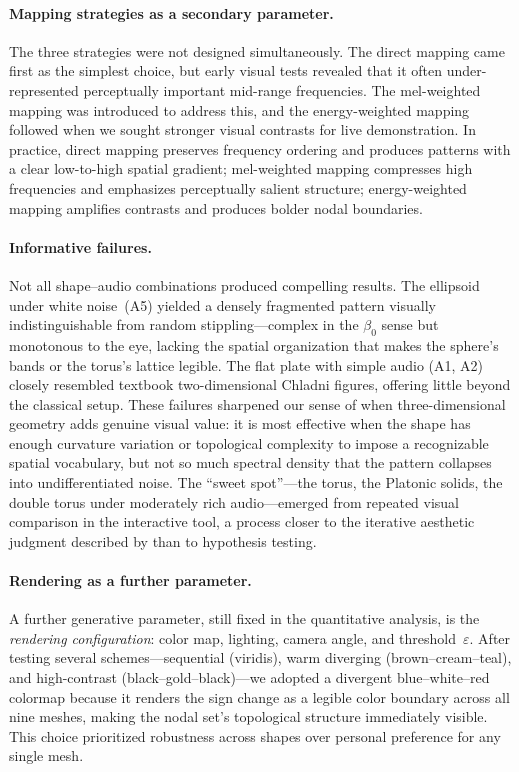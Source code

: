 \documentclass[]{interact}
\theoremstyle{plain}
\theoremstyle{definition}
\theoremstyle{remark}
\begin{document}
\paragraph{Mapping strategies as a secondary parameter.}
The three strategies were not designed simultaneously. The direct mapping came first as the simplest choice, but early visual tests revealed that it often under-represented perceptually important mid-range frequencies. The mel-weighted mapping was introduced to address this, and the energy-weighted mapping followed when we sought stronger visual contrasts for live demonstration. In practice, direct mapping preserves frequency ordering and produces patterns with a clear low-to-high spatial gradient; mel-weighted mapping compresses high frequencies and emphasizes perceptually salient structure; energy-weighted mapping amplifies contrasts and produces bolder nodal boundaries.

\paragraph{Informative failures.}
Not all shape--audio combinations produced compelling results. The ellipsoid under white noise~(A5) yielded a densely fragmented pattern visually indistinguishable from random stippling---complex in the $\beta_0$ sense but monotonous to the eye, lacking the spatial organization that makes the sphere's bands or the torus's lattice legible. The flat plate with simple audio (A1, A2) closely resembled textbook two-dimensional Chladni figures, offering little beyond the classical setup. These failures sharpened our sense of when three-dimensional geometry adds genuine visual value: it is most effective when the shape has enough curvature variation or topological complexity to impose a recognizable spatial vocabulary, but not so much spectral density that the pattern collapses into undifferentiated noise. The ``sweet spot''---the torus, the Platonic solids, the double torus under moderately rich audio---emerged from repeated visual comparison in the interactive tool, a process closer to the iterative aesthetic judgment described by \citet{feijs2019} than to hypothesis testing.

\paragraph{Rendering as a further parameter.}
A further generative parameter, still fixed in the quantitative analysis, is the \emph{rendering configuration}: color map, lighting, camera angle, and threshold~$\varepsilon$. After testing several schemes---sequential (viridis), warm diverging (brown--cream--teal), and high-contrast (black--gold--black)---we adopted a divergent blue--white--red colormap because it renders the sign change as a legible color boundary across all nine meshes, making the nodal set's topological structure immediately visible. This choice prioritized robustness across shapes over personal preference for any single mesh.
\end{document}
